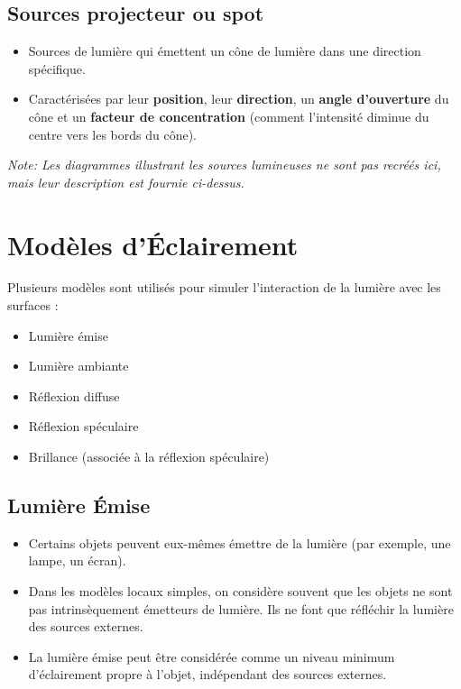 \documentclass{article}
\begin{document}
\subsection{Sources projecteur ou spot}
\begin{itemize}
    \item Sources de lumière qui émettent un cône de lumière dans une direction spécifique.
    \item Caractérisées par leur \textbf{position}, leur \textbf{direction}, un \textbf{angle d'ouverture} du cône et un \textbf{facteur de concentration} (comment l'intensité diminue du centre vers les bords du cône).
\end{itemize}

\textit{Note: Les diagrammes illustrant les sources lumineuses ne sont pas recréés ici, mais leur description est fournie ci-dessus.}

\section{Modèles d'Éclairement}

Plusieurs modèles sont utilisés pour simuler l'interaction de la lumière avec les surfaces :
\begin{itemize}
    \item Lumière émise
    \item Lumière ambiante
    \item Réflexion diffuse
    \item Réflexion spéculaire
    \item Brillance (associée à la réflexion spéculaire)
\end{itemize}

\subsection{Lumière Émise}
\begin{itemize}
    \item Certains objets peuvent eux-mêmes émettre de la lumière (par exemple, une lampe, un écran).
    \item Dans les modèles locaux simples, on considère souvent que les objets ne sont pas intrinsèquement émetteurs de lumière. Ils ne font que réfléchir la lumière des sources externes.
    \item La lumière émise peut être considérée comme un niveau minimum d'éclairement propre à l'objet, indépendant des sources externes.
\end{itemize}
\end{document}
